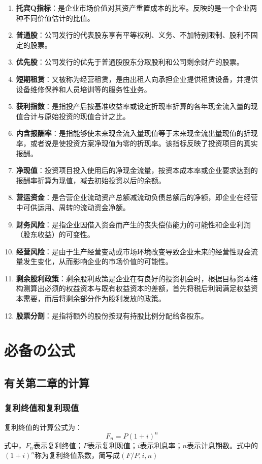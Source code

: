 \documentclass[
  10pt,
  twoside,
  openany,
  b5paper, %
  colorscheme = black, %
  xits = false,
]{qyxf-book}
\begin{document}
\begin{enumerate}
	\item \textbf{托宾Q指标}：是企业市场价值对其资产重置成本的比率。反映的是一个企业两种不同价值估计的比值。
	\item \textbf{普通股}：公司发行的代表股东享有平等权利、义务、不加特别限制、股利不固定的股票。
	\item \textbf{优先股}：公司发行的优先于普通股股东分取股利和公司剩余财产的股票。
	\item \textbf{短期租赁}：又被称为经营租赁，是由出租人向承担企业提供租赁设备，并提供设备维修保养和人员培训等的服务性业务。
	\item \textbf{获利指数}：是指投产后按基准收益率或设定折现率折算的各年现金流入量的现值合计与原始投资的现值合计之比。
	\item \textbf{内含报酬率}：是指能够使未来现金流入量现值等于未来现金流出量现值的折现率，或者说是使投资方案净现值为零的折现率。该指标反映了投资项目的真实报酬。
	\item \textbf{净现值}：投资项目投入使用后的净现金流量，按资本成本率或企业要求达到的报酬率折算为现值，减去初始投资以后的余额。
	\item \textbf{营运资金}：是合营企业流动资产总额减流动负债总额后的净额，即企业在经营中可供运用、周转的流动资金净额。
	\item \textbf{财务风险}：是指企业因借入资金而产生的丧失偿债能力的可能性和企业利润（股东收益）的可变性。
	\item \textbf{经营风险}：是由于生产经营变动或市场环境改变导致企业未来的经营性现金流量发生变化，从而影响企业的市场价值的可能性。
	\item \textbf{剩余股利政策}：剩余股利政策是企业在有良好的投资机会时，根据目标资本结构测算出必须的权益资本与既有权益资本的差额，首先将税后利润满足权益资本需要，而后将剩余部分作为股利发放的政策。
	\item \textbf{股票分割}：是指将额外的股份按现有持股比例分配给各股东。
\end{enumerate}

\chapter{必备の公式}
\section{有关第二章的计算}
\subsection{复利终值和复利现值}
复利终值的计算公式为：
\begin{equation*}
	F_n=P(1+i)^n
\end{equation*}
式中，$F_n$表示复利终值；$P$表示复利现值；$i$表示利息率；$n$表示计息期数。式中的$(1+i)^n$称为复利终值系数，简写成$(F/P,i,n)$
\end{document}
